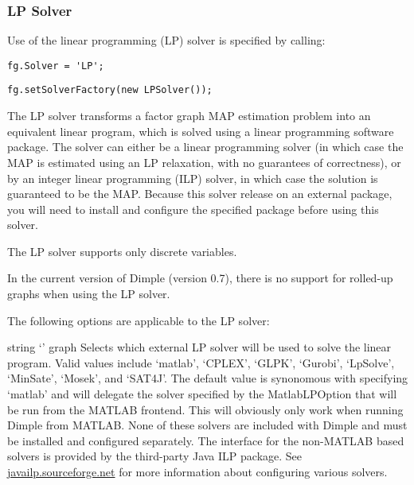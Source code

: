 \clearpage
\subsubsection{LP Solver}
\label{sec:LPSolver}

Use of the linear programming (LP) solver is specified by calling:

\ifmatlab
\begin{lstlisting}
fg.Solver = 'LP';
\end{lstlisting}
\fi
\ifjava
\begin{lstlisting}
fg.setSolverFactory(new LPSolver());
\end{lstlisting}
\fi

The LP solver transforms a factor graph MAP estimation problem into an equivalent linear program, which is solved using a linear programming software package. The solver can either be a linear programming solver (in which case the MAP is estimated using an LP relaxation, with no guarantees of correctness), or by an integer linear programming (ILP) solver, in which case the solution is guaranteed to be the MAP. Because this solver release on an external package, you will need to install and configure the specified package before using this solver.

The LP solver supports only discrete variables.

In the current version of Dimple (version 0.7), there is no support for rolled-up graphs when using the LP solver.

The following options are applicable to the LP solver:



{string}
{`'}
{graph}
{Selects which external LP solver will be used to solve the linear program. Valid values include `matlab', `CPLEX', `GLPK', `Gurobi', `LpSolve', `MinSate', `Mosek', and `SAT4J'. The default value is synonomous with specifying `matlab' and will delegate the solver specified by the MatlabLPOption that will be run from the MATLAB frontend. This will obviously only work when running Dimple from MATLAB. None of these solvers are included with Dimple and must be installed and configured separately. The interface for the non-MATLAB based solvers is provided by the third-party Java ILP package. See \href{http://javailp.sourceforge.net}{javailp.sourceforge.net} for more information about configuring various solvers.}

